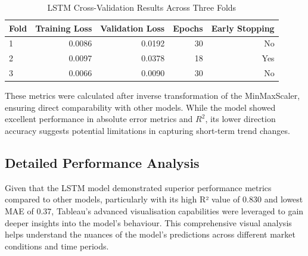 \documentclass[12pt,a4paper]{report}
\begin{document}
\begin{table}[htbp]
\centering
\caption{LSTM Cross-Validation Results Across Three Folds}
\label{tab:lstm_cv}
\begin{tabular}{lrrrr}
\toprule
Fold & Training Loss & Validation Loss & Epochs & Early Stopping \\
\midrule
1 & 0.0086 & 0.0192 & 30 & No \\
2 & 0.0097 & 0.0378 & 18 & Yes \\
3 & 0.0066 & 0.0090 & 30 & No \\
\bottomrule
\end{tabular}
\end{table}

These metrics were calculated after inverse transformation of the MinMaxScaler, ensuring direct comparability with other models. While the model showed excellent performance in absolute error metrics and $R^2$, its lower direction accuracy suggests potential limitations in capturing short-term trend changes.

\subsection{Detailed Performance Analysis}
Given that the LSTM model demonstrated superior performance metrics compared to other models, particularly with its high R² value of 0.830 and lowest MAE of 0.37, Tableau's advanced visualisation capabilities were leveraged to gain deeper insights into the model's behaviour. This comprehensive visual analysis helps understand the nuances of the model's predictions across different market conditions and time periods.
\end{document}
